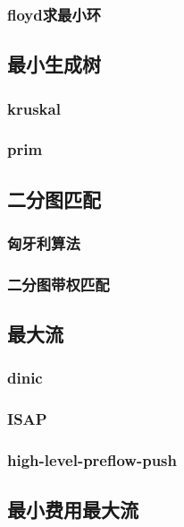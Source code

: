 ﻿\documentclass[a4paper,twocolumn]{article}
\begin{document}
\subsubsection{floyd求最小环}

\subsection{最小生成树}
\subsubsection{kruskal}

\subsubsection{prim}

\subsection{二分图匹配}
\subsubsection{匈牙利算法}

\subsubsection{二分图带权匹配}

\subsection{最大流}
\subsubsection{dinic}

\subsubsection{ISAP}

\subsubsection{high-level-preflow-push}

\subsection{最小费用最大流}
\end{document}
